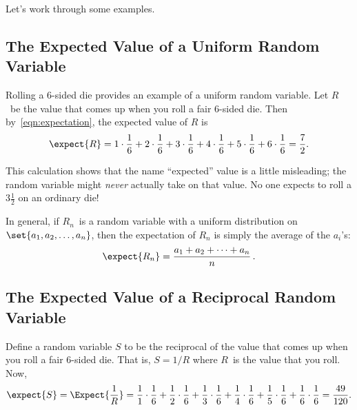 Let's work through some examples.

\subsection{The Expected Value of a Uniform Random Variable}

Rolling a 6-sided die provides an example of a uniform random
variable.  Let $R$~be the value that comes up when you roll a fair
6-sided die.  Then by~\eqref{eqn:expectation}, the expected value of
$R$ is
\[
\expect{R}
     = 1 \cdot \frac{1}{6} + 2 \cdot \frac{1}{6} + 3 \cdot \frac{1}{6} +
        4 \cdot \frac{1}{6} + 5 \cdot \frac{1}{6} + 6 \cdot \frac{1}{6}
     = \frac{7}{2}.
\]

\iffalse
\begin{align*}
\expect{R}
    & = \sum_{k=1}^6 k \cdot \frac{1}{6} \\
    & = 1 \cdot \frac{1}{6} + 2 \cdot \frac{1}{6} + 3 \cdot \frac{1}{6} +
        4 \cdot \frac{1}{6} + 5 \cdot \frac{1}{6} + 6 \cdot \frac{1}{6} \\
    & = \frac{7}{2}
\end{align*}
\fi

This calculation shows that the name ``expected'' value is a little
misleading; the random variable might \emph{never} actually take on that
value.  No one expects to roll a $3 \frac{1}{2}$ on an ordinary
die!

In general, if $R_n$~is a random variable with a uniform distribution
on~$\set{a_1,a_2, \dots, a_n}$, then the expectation of $R_n$ is
simply the average of the $a_i$'s:
\[
\expect{R_n} = \frac{a_1+a_2+\cdots+a_n}{n}\, .
\]

\subsection{The Expected Value of a Reciprocal Random Variable}

Define a random variable $S$ to be the reciprocal of the value that
comes up when you roll a fair 6-sided die.  That is, $S = 1/R$ where
$R$~is the value that you roll.  Now,
\[
\expect{S}  =\Expect{\frac{1}{R}}
            = \frac{1}{1} \cdot \frac{1}{6}
               + \frac{1}{2} \cdot \frac{1}{6}
               + \frac{1}{3} \cdot \frac{1}{6}
               + \frac{1}{4} \cdot \frac{1}{6}
               + \frac{1}{5} \cdot \frac{1}{6}
               + \frac{1}{6} \cdot \frac{1}{6}
               = \frac{49}{120}.
\]

\iffalse
\begin{align*}
\expect{S} & =\expect{\frac{1}{R}}\\
           &  = \frac{1}{1} \cdot \frac{1}{6}
+ \frac{1}{2} \cdot \frac{1}{6}
+ \frac{1}{3} \cdot \frac{1}{6}
+ \frac{1}{4} \cdot \frac{1}{6}
+ \frac{1}{5} \cdot \frac{1}{6}
+ \frac{1}{6} \cdot \frac{1}{6} %
= \frac{49}{120}.
\end{align*}
\fi

